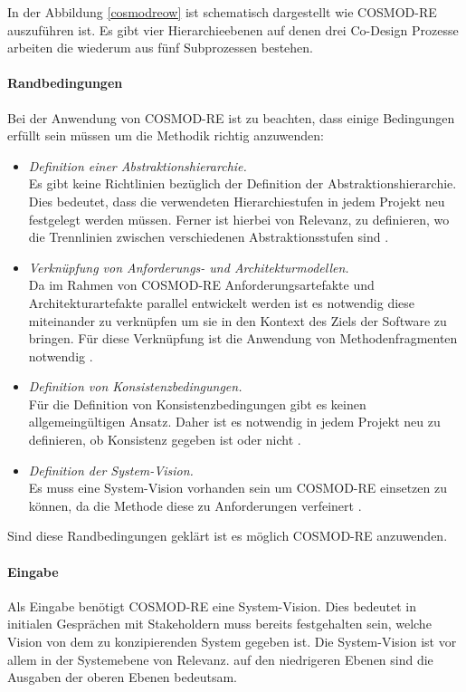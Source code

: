 In der Abbildung \ref{cosmodreow} ist schematisch dargestellt wie COSMOD-RE auszuf\"uhren ist. Es gibt vier Hierarchieebenen auf denen drei Co-Design Prozesse arbeiten die wiederum aus f\"unf Subprozessen bestehen.\\

\paragraph{Randbedingungen}
Bei der Anwendung von COSMOD-RE ist zu beachten, dass einige Bedingungen erf\"ullt sein m\"ussen um die Methodik richtig anzuwenden:\\

\begin{itemize}
\item \emph{Definition einer Abstraktionshierarchie.} \\
Es gibt keine Richtlinien bez\"uglich der Definition der Abstraktionshierarchie. Dies bedeutet, dass die verwendeten Hierarchiestufen in jedem Projekt neu festgelegt werden m\"ussen. Ferner ist hierbei von Relevanz, zu definieren, wo die Trennlinien zwischen verschiedenen Abstraktionsstufen sind \cite{Sik01}.
\item \emph{Verkn\"upfung von Anforderungs- und Architekturmodellen.} \\
Da im Rahmen von COSMOD-RE Anforderungsartefakte und Architekturartefakte parallel entwickelt werden ist es notwendig diese miteinander zu verkn\"upfen um sie in den Kontext des Ziels der Software zu bringen. F\"ur diese Verkn\"upfung ist die Anwendung von Methodenfragmenten notwendig \cite{Sik01}.
\item \emph{Definition von Konsistenzbedingungen.} \\
F\"ur die Definition von Konsistenzbedingungen gibt es keinen allgemeing\"ultigen Ansatz. Daher ist es notwendig in jedem Projekt neu zu definieren, ob Konsistenz gegeben ist oder nicht \cite{Sik01}.\\
\item \emph{Definition der System-Vision.} \\
Es muss eine System-Vision vorhanden sein um COSMOD-RE einsetzen zu k\"onnen, da die Methode diese zu Anforderungen verfeinert \cite{Poh01}.\\
\end{itemize}

Sind diese Randbedingungen gekl\"art ist es m\"oglich COSMOD-RE anzuwenden.\\

\paragraph{Eingabe}
Als Eingabe ben\"otigt COSMOD-RE eine System-Vision. Dies bedeutet in initialen Gespr\"achen mit Stakeholdern muss bereits festgehalten sein, welche Vision von dem zu konzipierenden System gegeben ist. Die System-Vision ist vor allem in der Systemebene von Relevanz. auf den niedrigeren Ebenen sind die Ausgaben der oberen Ebenen bedeutsam.\\

